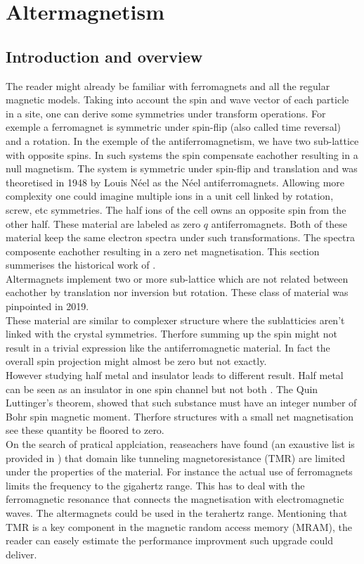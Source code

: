 \documentclass[../main.tex]{main.tex}
\begin{document}
\section{Altermagnetism}
\subsection{Introduction and overview}
The reader might already be familiar with ferromagnets and all the regular magnetic models. Taking into account the spin and
wave vector of each particle in a site, one can derive some symmetries under transform operations. For exemple a
ferromagnet is symmetric under spin-flip (also called time reversal) and a rotation. In the exemple of the antiferromagnetism,
we have two sub-lattice with opposite spins. In such systems the spin compensate eachother resulting in a null magnetism.
The system is symmetric under spin-flip and translation and was theoretised in 1948 by Louis Néel as the Néel antiferromagnets.
Allowing more complexity one could imagine multiple ions in a unit cell linked by rotation, screw, etc symmetries. The half ions 
of the cell owns an opposite spin from the other half. These material are labeled as zero $q$ antiferromagnets. Both of these material
keep the same electron spectra under such transformations. The spectra composente eachother resulting in a zero net magnetisation.
This section summerises the historical work of \cite{Mazin2024}.\\

Altermagnets implement two or more sub-lattice which are not related between eachother by translation nor inversion but rotation.
These class of material was pinpointed in 2019.\\
These material are similar to complexer structure where the sublatticies aren't linked with the crystal symmetries.
Therfore summing up the spin might not result in a trivial expression like the antiferromagnetic material. In fact the overall
spin projection might almost be zero but not exactly.\\
However studying half metal and insulator leads to different result. Half metal can be seen as an insulator in one spin channel 
but not both \cite{Mazin2024}. The Quin Luttinger's theorem, showed that such substance must have an integer number of Bohr spin
magnetic moment. Therfore structures with a small net magnetisation see these quantity be floored to zero. \\

On the search of pratical applciation, reaseachers have found (an exaustive list is provided in \cite{Mazin2024}) that
domain like tunneling magnetoresistance (TMR) are limited under the properties of the material. For instance the actual use 
of ferromagnets limits the frequency to the gigahertz range. This has to deal with the ferromagnetic resonance that connects 
the magnetisation with electromagnetic waves. The altermagnets could be used in the terahertz range.
Mentioning that TMR is a key component in the magnetic random access memory (MRAM), the reader can easely estimate the performance
improvment such upgrade could deliver.\\
 
\end{document}
